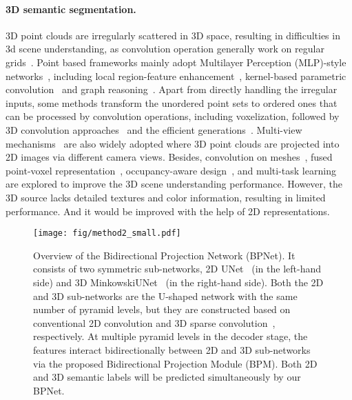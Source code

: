 \documentclass[final]{cvpr}
\begin{document}
\paragraph{3D semantic segmentation.}
\label{subsec:3d_semseg}
3D point clouds are irregularly scattered in 3D space, resulting in difficulties in 3d scene understanding, as convolution operation generally work on regular grids~\cite{zhao2019pointweb}. 
Point based frameworks mainly adopt Multilayer Perception (MLP)-style networks~\cite{qi2017pointnet,qi2017pointnet++}, including local region-feature enhancement~\cite{wang2019dynamic,xu2018spidercnn,zhao2019pointweb,hu2020randla}, kernel-based parametric convolution~\cite{wang2018deep,wu2019pointconv,thomas2019kpconv} and graph reasoning~\cite{wang2018local,wang2019graph,jiang2019hierarchical,li2019deepgcns,lei2020seggcn}. 
Apart from directly handling the irregular inputs, some methods transform the unordered point sets to ordered ones that can be processed by convolution operations, including voxelization, followed by 3D convolution approaches~\cite{maturana2015voxnet,song2017semantic,tchapmi2017segcloud,han2020occuseg} and the efficient generations~\cite{riegler2017octnet,sscn2018,choy20194d}. 
Multi-view mechanisms~\cite{su15mvcnn,su20153dassisted,qi2016volumetric,akundu2020virtualMVFusion} are also widely adopted where 3D point clouds are projected into 2D images via different camera views. 
Besides, convolution on meshes~\cite{schult2020dualconvmesh}, fused point-voxel representation~\cite{zhang12356deep}, occupancy-aware design~\cite{han2020occuseg}, and multi-task learning~\cite{hu2020jsenet} are explored to improve the 3D scene understanding performance.
However, the 3D source lacks detailed textures and color information, resulting in limited performance. And it would be improved with the help of 2D representations.


\begin{figure*}[!t] 
	\centering
	\texttt{[image: fig/method2\_small.pdf]}
\caption{
		Overview of the Bidirectional Projection Network (BPNet). 
	It consists of two symmetric sub-networks, 2D UNet~\cite{ronneberger2015u} (in the left-hand side) and 3D MinkowskiUNet~\cite{choy20194d} (in the right-hand side).
	Both the 2D and 3D sub-networks are the U-shaped network with the same number of pyramid levels, but they are constructed based on conventional 2D convolution and 3D sparse convolution~\cite{sscn2018}, respectively.
	At multiple pyramid levels in the decoder stage, the features interact bidirectionally between 2D and 3D sub-networks via the proposed Bidirectional Projection Module (BPM). 
Both 2D and 3D semantic labels will be predicted simultaneously by our BPNet. 
	}
		\vspace{-4mm}
	\label{fig:method}
\end{figure*} 
\end{document}
